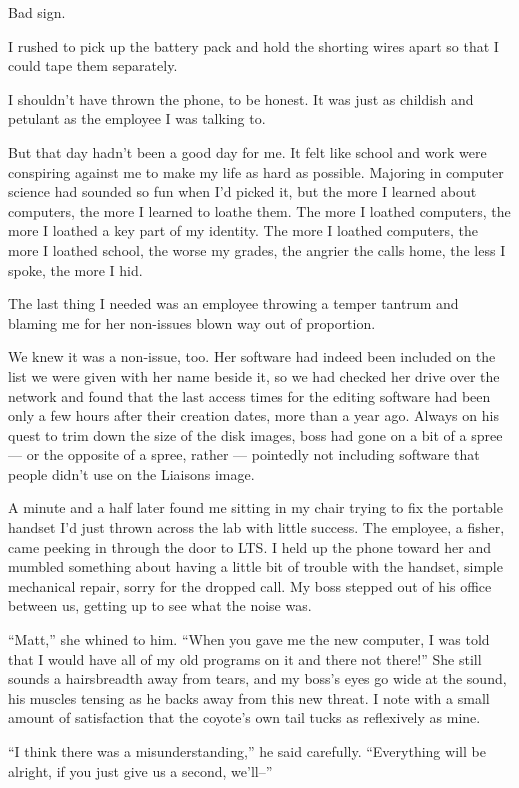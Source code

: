 Bad sign.

I rushed to pick up the battery pack and hold the shorting wires apart so that I could tape them separately.

I shouldn't have thrown the phone, to be honest. It was just as childish and petulant as the employee I was talking to.

But that day hadn't been a good day for me. It felt like school and work were conspiring against me to make my life as hard as possible. Majoring in computer science had sounded so fun when I'd picked it, but the more I learned about computers, the more I learned to loathe them. The more I loathed computers, the more I loathed a key part of my identity. The more I loathed computers, the more I loathed school, the worse my grades, the angrier the calls home, the less I spoke, the more I hid.

The last thing I needed was an employee throwing a temper tantrum and blaming me for her non-issues blown way out of proportion.

We knew it was a non-issue, too. Her software had indeed been included on the list we were given with her name beside it, so we had checked her drive over the network and found that the last access times for the editing software had been only a few hours after their creation dates, more than a year ago. Always on his quest to trim down the size of the disk images, boss had gone on a bit of a spree --- or the opposite of a spree, rather --- pointedly not including software that people didn't use on the Liaisons image.

A minute and a half later found me sitting in my chair trying to fix the portable handset I'd just thrown across the lab with little success. The employee, a fisher, came peeking in through the door to LTS. I held up the phone toward her and mumbled something about having a little bit of trouble with the handset, simple mechanical repair, sorry for the dropped call. My boss stepped out of his office between us, getting up to see what the noise was.

``Matt,'' she whined to him. ``When you gave me the new computer, I was told that I would have all of my old programs on it and there not there!'' She still sounds a hairsbreadth away from tears, and my boss's eyes go wide at the sound, his muscles tensing as he backs away from this new threat. I note with a small amount of satisfaction that the coyote's own tail tucks as reflexively as mine.

``I think there was a misunderstanding,'' he said carefully. ``Everything will be alright, if you just give us a second, we'll--''

